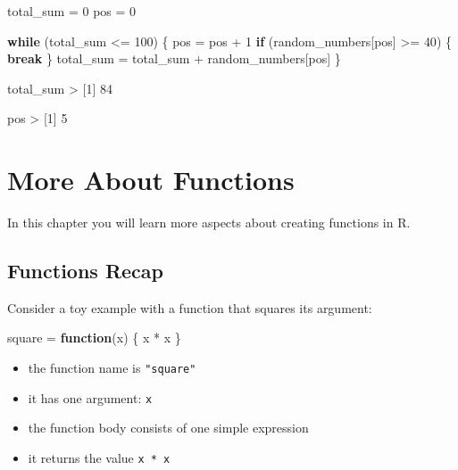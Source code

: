 \documentclass[
]{book}
\newenvironment{Shaded}{\begin{snugshade}}{\end{snugshade}}
\newcommand{\ControlFlowTok}[1]{\textcolor[rgb]{0.13,0.29,0.53}{\textbf{#1}}}
\newcommand{\DecValTok}[1]{\textcolor[rgb]{0.00,0.00,0.81}{#1}}
\newcommand{\NormalTok}[1]{#1}
\newcommand{\OtherTok}[1]{\textcolor[rgb]{0.56,0.35,0.01}{#1}}
\newcommand{\SpecialCharTok}[1]{\textcolor[rgb]{0.00,0.00,0.00}{#1}}
\providecommand{\tightlist}{%
  \setlength{\itemsep}{0pt}\setlength{\parskip}{0pt}}
\begin{document}
\begin{Shaded}
\begin{Highlighting}[]
\NormalTok{total\_sum }\OtherTok{=} \DecValTok{0}
\NormalTok{pos }\OtherTok{=} \DecValTok{0}

\ControlFlowTok{while}\NormalTok{ (total\_sum }\SpecialCharTok{\textless{}=} \DecValTok{100}\NormalTok{) \{}
\NormalTok{  pos }\OtherTok{=}\NormalTok{ pos }\SpecialCharTok{+} \DecValTok{1}
  \ControlFlowTok{if}\NormalTok{ (random\_numbers[pos] }\SpecialCharTok{\textgreater{}=} \DecValTok{40}\NormalTok{) \{}
    \ControlFlowTok{break}
\NormalTok{  \}}
\NormalTok{  total\_sum }\OtherTok{=}\NormalTok{ total\_sum }\SpecialCharTok{+}\NormalTok{ random\_numbers[pos]}
\NormalTok{\}}

\NormalTok{total\_sum}
\SpecialCharTok{\textgreater{}}\NormalTok{ [}\DecValTok{1}\NormalTok{] }\DecValTok{84}

\NormalTok{pos}
\SpecialCharTok{\textgreater{}}\NormalTok{ [}\DecValTok{1}\NormalTok{] }\DecValTok{5}
\end{Highlighting}
\end{Shaded}

\hypertarget{functions2}{%
\chapter{More About Functions}\label{functions2}}

In this chapter you will learn more aspects about creating functions in R.

\hypertarget{functions-recap}{%
\section{Functions Recap}\label{functions-recap}}

Consider a toy example with a function that squares its argument:

\begin{Shaded}
\begin{Highlighting}[]
\NormalTok{square }\OtherTok{=} \ControlFlowTok{function}\NormalTok{(x) \{}
\NormalTok{  x }\SpecialCharTok{*}\NormalTok{ x}
\NormalTok{\}}
\end{Highlighting}
\end{Shaded}

\begin{itemize}
\tightlist
\item
  the function name is \texttt{"square"}
\item
  it has one argument: \texttt{x}
\item
  the function body consists of one simple expression
\item
  it returns the value \texttt{x\ *\ x}
\end{itemize}
\end{document}

